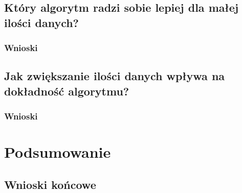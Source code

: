 \documentclass[12pt, a4paper]{article}
\begin{document}
\subsection{Który algorytm radzi sobie lepiej dla małej ilości danych?}

\subsubsection{Wnioski}

\subsection{Jak zwiększanie ilości danych wpływa na dokładność algorytmu?}

\subsubsection{Wnioski}

\section{Podsumowanie}

\subsection{Wnioski końcowe}

\nocite{*}


\end{document}

